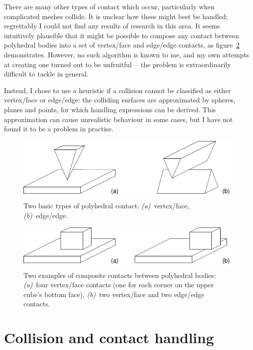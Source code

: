There are many other types of contact which occur, particularly when complicated meshes
collide. It is unclear how these might best be handled; regrettably I could not find any results
of research in this area. It seems intuitively plausible that it might be possible to compose any
contact between polyhedral bodies into a set of vertex/face and edge/edge contacts, as
figure~\ref{contacts2Figure} demonstrates. However, no such algorithm is known to me, and my own
attempts at creating one turned out to be unfruitful~-- the problem is extraordinarily difficult
to tackle in general.

Instead, I chose to use a heuristic if a collision cannot be classified as either vertex/face or
edge/edge: the colliding surfaces are approximated by spheres, planes and points, for which
handling expressions can be derived. This approximation can cause unrealistic behaviour in some
cases, but I have not found it to be a problem in practise.

\begin{figure}
\centerline{\includegraphics{figures/contacts1}}
\caption{Two basic types of polyhedral contact: \emph{(a)}~vertex/face, \emph{(b)}~edge/edge.
    \label{contacts1Figure}}
\end{figure}

\begin{figure}
\centerline{\includegraphics{figures/contacts2}}
\caption{Two examples of composite contacts between polyhedral bodies:
    \emph{(a)}~four vertex/face contacts (one for each corner on the upper cube's bottom face),
    \emph{(b)}~two vertex/face and two edge/edge contacts.
    \label{contacts2Figure}}
\end{figure}


\section{Collision and contact handling\label{collisionHandling}}

